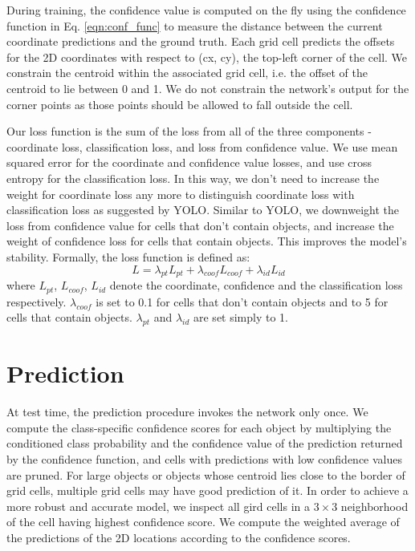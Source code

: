 During training, the confidence value is computed on the fly using the confidence function in Eq. \ref{eqn:conf_func} to measure the distance between the current coordinate predictions and the ground truth. Each grid cell predicts the offsets for the 2D coordinates with respect to (cx, cy), the top-left corner of the cell. We constrain the centroid within the associated grid cell, i.e. the offset of the centroid to lie between 0 and 1. We do not constrain the network's output for the corner points as those points should be allowed to fall outside the cell.

Our loss function is the sum of the loss from all of the three components - coordinate loss, classification loss, and loss from confidence value. We use mean squared error for the coordinate and confidence value losses, and use cross entropy for the classification loss. In this way, we don't need to increase the weight for coordinate loss any more to distinguish coordinate loss with classification loss as suggested by YOLO. Similar to YOLO, we downweight the loss from confidence value for cells that don't contain objects, and increase the weight of confidence loss for cells that contain objects. This improves the model's stability. Formally, the loss function is defined as:
\begin{equation}
L = \lambda_{pt}L_{pt} + \lambda_{coof}L_{coof} + \lambda_{id}L_{id}
\end{equation}
where $ L_{pt} $, $ L_{coof} $, $ L_{id} $ denote the coordinate, confidence and the classification loss respectively. $ \lambda_{coof} $ is set to 0.1 for cells that don't contain objects and to 5 for cells that contain objects. $ \lambda_{pt} $ and $ \lambda_{id} $ are set simply to 1.

\section{Prediction}
At test time, the prediction procedure invokes the network only once. We compute the class-specific confidence scores for each object by multiplying the conditioned class probability and the confidence value of the prediction returned by the confidence function, and cells with predictions with low confidence values are pruned. For large objects or objects whose centroid lies close to the border of grid cells, multiple grid cells may have good prediction of it. In order to achieve a more robust and accurate model, we inspect all gird cells in a $ 3 \times 3 $ neighborhood of the cell having highest confidence score. We compute the weighted average of the predictions of the 2D locations according to the confidence scores.

